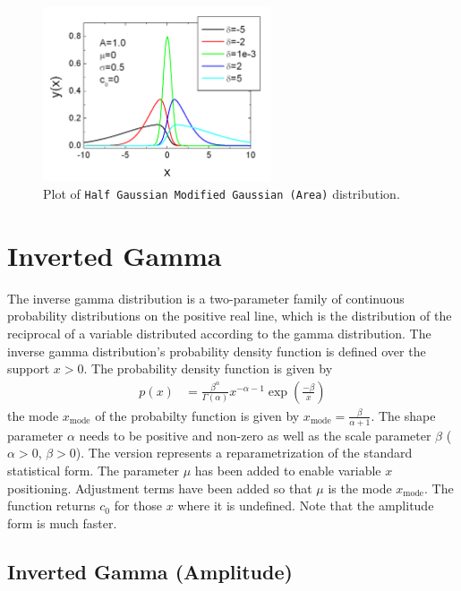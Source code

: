 \begin{figure}[htb]
\begin{center}
\includegraphics[width=0.6\textwidth]{halfGaussianModifiedGaussianArea.png}
\end{center}
\caption{Plot of \texttt{Half Gaussian Modified Gaussian (Area)} distribution.}
\label{fig:GMGArea}
\end{figure}


\clearpage
\section{Inverted Gamma}
\label{sec:InvertedGamma}

The inverse gamma distribution is a two-parameter family of
continuous probability distributions on the positive real line,
which is the distribution of the reciprocal of a variable
distributed according to the gamma distribution. The inverse gamma
distribution's probability density function is defined over the
support $x > 0$. The probability density function is given by
\begin{align}
p(x) &= \frac{\beta^\alpha}{\Gamma(\alpha)} x^{-\alpha - 1} \exp
\left(\frac{-\beta}{x}\right)
\end{align}
the mode $x_\text{mode}$ of the probabilty function is given by
$x_\text{mode} = \frac{\beta}{\alpha+1}$. The shape parameter
$\alpha$ needs to be positive and non-zero as well as the scale
parameter $\beta$ ($\alpha>0$, $\beta>0$).
The \SASfit version represents a reparametrization of the standard statistical
form. The parameter $\mu$ has been added to enable variable $x$ positioning.
Adjustment terms have been added so that $\mu$ is the mode $x_\text{mode}$.
The function returns $c_0$ for those $x$ where it is undefined.
Note that the amplitude form is much faster.

\clearpage
\subsection{Inverted Gamma (Amplitude)} ~\\
\label{sec:InvertedGammaAmplitude}

